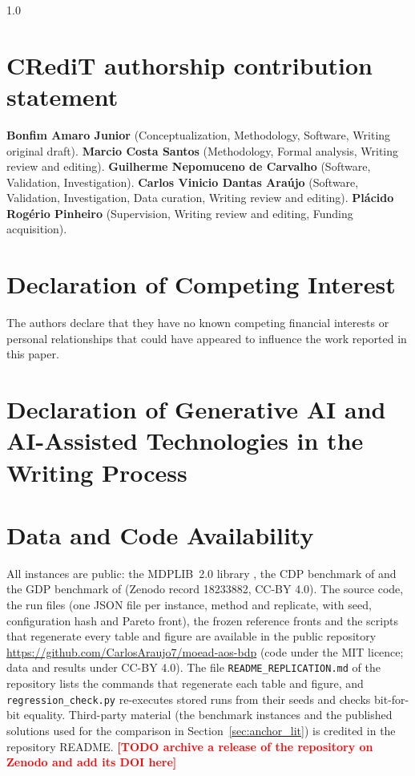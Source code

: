 \documentclass[final,3p,times,11pt,authoryear]{elsarticle}
\theoremstyle{plain}
\theoremstyle{definition}
\theoremstyle{remark}
\newcommand{\todo}[1]{\textcolor{red}{\textbf{[TODO #1]}}}
\begin{document}
\begingroup
\small
\begin{spacing}{1.0}

\section*{CRediT authorship contribution statement}
\textbf{Bonfim Amaro Junior} (Conceptualization, Methodology, Software, Writing original draft).
\textbf{Marcio Costa Santos} (Methodology, Formal analysis, Writing review and editing).
\textbf{Guilherme Nepomuceno de Carvalho} (Software, Validation, Investigation).
\textbf{Carlos Vinicio Dantas Araújo} (Software, Validation, Investigation, Data curation, Writing review and editing).
\textbf{Plácido Rogério Pinheiro} (Supervision, Writing review and editing, Funding acquisition).

\section*{Declaration of Competing Interest}
The authors declare that they have no known competing financial interests or personal relationships that could have appeared to influence the work reported in this paper.

\section*{Declaration of Generative AI and AI-Assisted Technologies in the Writing Process}

\section*{Data and Code Availability}
All instances are public: the MDPLIB~2.0 library \citep{marti2021a}, the CDP benchmark of \citet{peiro2021} and the GDP benchmark of \citet{lozanoosorio2022} (Zenodo record 18233882, CC-BY 4.0). The source code, the run files (one JSON file per instance, method and replicate, with seed, configuration hash and Pareto front), the frozen reference fronts and the scripts that regenerate every table and figure are available in the public repository \url{https://github.com/CarlosAraujo7/moead-aos-bdp} (code under the MIT licence; data and results under CC-BY 4.0). The file \texttt{README\_REPLICATION.md} of the repository lists the commands that regenerate each table and figure, and \texttt{regression\_check.py} re-executes stored runs from their seeds and checks bit-for-bit equality. Third-party material (the benchmark instances and the published solutions used for the comparison in Section~\ref{sec:anchor_lit}) is credited in the repository README. \todo{archive a release of the repository on Zenodo and add its DOI here}


\end{spacing}
\end{document}
